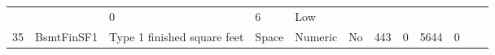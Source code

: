 \documentclass[11pt]{article}
\begin{document}
\begin{longtable}[]{@{}llllllllllll@{}}
\begin{minipage}[t]{0.04\columnwidth}
\strut
\end{minipage} & \begin{minipage}[t]{0.04\columnwidth}\raggedright\strut
\strut
\end{minipage} & \begin{minipage}[t]{0.04\columnwidth}\raggedright\strut
0\strut
\end{minipage} & \begin{minipage}[t]{0.04\columnwidth}\raggedright\strut
6\strut
\end{minipage} & \begin{minipage}[t]{0.04\columnwidth}\raggedright\strut
Low\strut
\end{minipage}\tabularnewline
\begin{minipage}[t]{0.04\columnwidth}\raggedright\strut
35\strut
\end{minipage} & \begin{minipage}[t]{0.04\columnwidth}\raggedright\strut
BsmtFinSF1\strut
\end{minipage} & \begin{minipage}[t]{0.04\columnwidth}\raggedright\strut
Type 1 finished square feet\strut
\end{minipage} & \begin{minipage}[t]{0.04\columnwidth}\raggedright\strut
Space\strut
\end{minipage} & \begin{minipage}[t]{0.04\columnwidth}\raggedright\strut
Numeric\strut
\end{minipage} & \begin{minipage}[t]{0.04\columnwidth}\raggedright\strut
No\strut
\end{minipage} & \begin{minipage}[t]{0.04\columnwidth}\raggedright\strut
443\strut
\end{minipage} & \begin{minipage}[t]{0.04\columnwidth}\raggedright\strut
0\strut
\end{minipage} & \begin{minipage}[t]{0.04\columnwidth}\raggedright\strut
5644\strut
\end{minipage} & \begin{minipage}[t]{0.04\columnwidth}\raggedright\strut
0\strut
\end{minipage} & \begin{minipage}[t]{0.04\columnwidth}\raggedright\strut
\strut
\end{minipage} & \begin{minipage}[t]{0.04\columnwidth}\raggedright\strut

\end{minipage}
\end{longtable}
\end{document}
